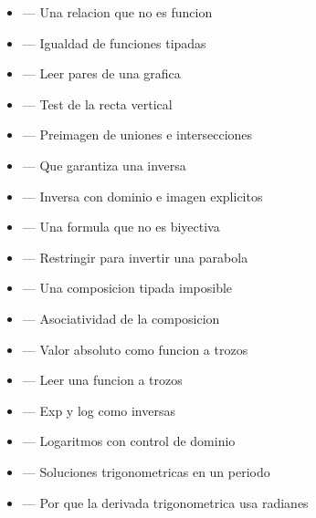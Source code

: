 \documentclass[10pt,a4paper,oneside,openany]{book}
\begin{document}
\begin{itemize}
\item {} — Una relacion que no es funcion
\item {} — Igualdad de funciones tipadas
\item {} — Leer pares de una grafica
\item {} — Test de la recta vertical
\item {} — Preimagen de uniones e intersecciones
\item {} — Que garantiza una inversa
\item {} — Inversa con dominio e imagen explicitos
\item {} — Una formula que no es biyectiva
\item {} — Restringir para invertir una parabola
\item {} — Una composicion tipada imposible
\item {} — Asociatividad de la composicion
\item {} — Valor absoluto como funcion a trozos
\item {} — Leer una funcion a trozos
\item {} — Exp y log como inversas
\item {} — Logaritmos con control de dominio
\item {} — Soluciones trigonometricas en un periodo
\item {} — Por que la derivada trigonometrica usa radianes
\end{itemize}
\end{document}
